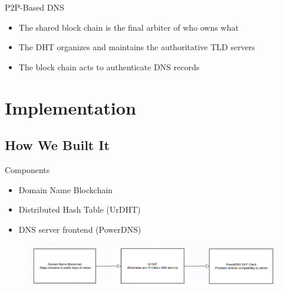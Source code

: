 \documentclass[11pt]{beamer}
\begin{document}
\begin{frame}{P2P-Based DNS}
	
	\begin{itemize}
		\item The shared block chain is the final arbiter of who owns what
		\item The DHT organizes and maintains the authoritative TLD servers
		\item The block chain acts to authenticate DNS records
	\end{itemize}
\end{frame}



\section{Implementation}

\subsection{How We Built It}

\begin{frame}{Components}
	
	
	\begin{itemize}
		\item Domain Name Blockchain 
		\item Distributed Hash Table (UrDHT)
		\item DNS server frontend (PowerDNS)
	\end{itemize}
	
	\begin{figure}
		\centering
		\includegraphics[width=\linewidth]{arch}
		\label{fig:arch}
	\end{figure}
	
\end{frame}


\end{document}

